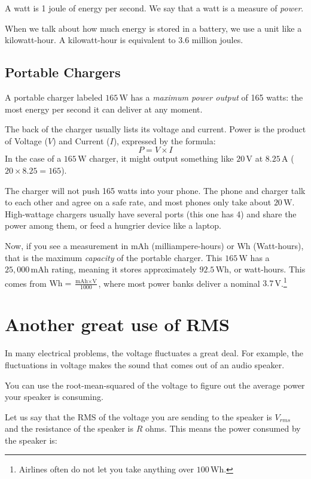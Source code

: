 A watt is 1 joule of energy per second. We say that a watt is a
measure of \textit{power}.

When we talk about how much energy is stored in a battery, we use a
unit like a kilowatt-hour. A kilowatt-hour is equivalent to 3.6 million
joules.
\subsection*{Portable Chargers}
A portable charger labeled $165\, \textrm{W}$ has a \textit{maximum power output} of 165 watts: the most energy per second it can deliver at any moment.

The back of the charger usually lists its voltage and current. Power is the product of Voltage ($V$) and Current ($I$), expressed by the formula:
$$P = V \times I$$
In the case of a $165\, \textrm{W}$ charger, it might output something like $20 \, \textrm{V}$ at $8.25 \, \textrm{A}$ ($20 \times 8.25 = 165$).

The charger will not push 165 watts into your phone. The phone and charger talk to each other and agree on a safe rate, and most phones only take about $20 \,\textrm{W}$. High-wattage chargers usually have several ports (this one has 4) and share the power among them, or feed a hungrier device like a laptop.

Now, if you see a measurement in mAh (milliampere-hours) or Wh (Watt-hours), that is the maximum \textit{capacity} of the portable charger. This $165\, \textrm{W}$ has a $25,000 \,\textrm{mAh}$ rating, meaning it stores approximately $92.5 \,  \textrm{Wh}$, or watt-hours. This comes from $\text{Wh} = \frac{\text{mAh} \times \text{V}}{1000}$, where most power banks deliver a nominal $3.7 \, \textrm{V}$.\footnote{Airlines often do not let you take anything over $100 \, \textrm{Wh}$. }
\section{Another great use of RMS}

In many electrical problems, the voltage fluctuates a great deal.  For
example, the fluctuations in voltage makes the sound that comes out of an
audio speaker.

You can use the root-mean-squared of the voltage to figure out the average power
your speaker is consuming.

Let us say that the RMS of the voltage you are sending to the speaker is $V_{rms}$
and the resistance of the speaker is $R$ ohms. This means the power consumed
by the speaker is:

